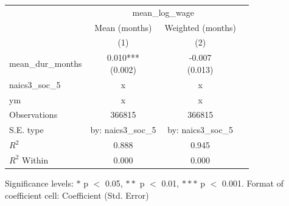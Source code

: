 \renewcommand\cellalign{t}
\begin{threeparttable}
\begin{tabular}{lccc}
\toprule
 & \multicolumn{2}{c}{mean_log_wage} \\
\cmidrule(lr){2-3} 
 & Mean (months) & Weighted (months) \\
 & (1) & (2) \\
\midrule
\addlinespace
mean_dur_months & \makecell{0.010*** \\ (0.002)} & \makecell{-0.007 \\ (0.013)} \\
\midrule
\addlinespace
naics3_soc_5 & x & x \\
ym & x & x \\
\midrule
\addlinespace
Observations & 366815 & 366815 \\
S.E. type & by: naics3_soc_5 & by: naics3_soc_5 \\
$R^2$ & 0.888 & 0.945 \\
$R^2$ Within & 0.000 & 0.000 \\
\bottomrule
\end{tabular}
\footnotesize Significance levels: $*$ p $<$ 0.05, $**$ p $<$ 0.01, $***$ p $<$ 0.001. Format of coefficient cell: Coefficient 
 (Std. Error)
\end{threeparttable}